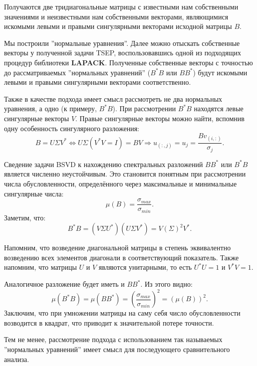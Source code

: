 Получаются две тридиагональные матрицы с известными нам собственными значениями и неизвестными нам собственными векторами, являющимися искомыми левыми и правыми сингулярными векторами исходной матрицы $B$.

Мы построили ''нормальные уравнения''. Далее можно отыскать собственные векторы у полученной задачи TSEP, воспользовавшись одной из подходящих процедур библиотеки \textbf{LAPACK}. Полученные собственные векторы с точностью до рассматриваемых ''нормальных уравнений'' (\(B^*B\) или \(BB^*\)) будут искомыми левыми и правыми сингулярными векторами соответственно.

Также в качестве подхода имеет смысл рассмотреть не два нормальных уравнения, а одно (к примеру, $B^*B$). При рассмотрении $B^*B$ находятся левые сингулярные векторы $V$. Правые сингулярные векторы можно найти, вспомнив одну особенность сингулярного разложения:
\begin{equation*}
     B=U \Sigma V^* \Leftrightarrow U\Sigma(V^*V=I)=BV \Rightarrow u_{(:,j)}=u_j= \frac{Bv_{(i,:)}}{\sigma_j}.
\end{equation*}


Сведение задачи BSVD к нахождению спектральных разложений \( B B^* \) или \( B^* B \) является численно неустойчивым. Это становится понятным при рассмотрении числа обусловленности, определённого через максимальные и минимальные сингулярные числа:
\[\mu(B) = \frac{\sigma_{max}}{\sigma_{min}}.\]
Заметим, что:
\[ B^*B=(V\Sigma U^*)(U \Sigma V^*)=V (\Sigma)^2 V^*. \]

\begin{note}
    Напомним, что возведение диагональной матрицы в степень эквивалентно возведению всех элементов диагонали в соответствующий показатель. Также напомним, что матрицы \(U\) и \(V\) являются унитарными, то есть \(U^*U=1\) и \(V^*V=1\).
\end{note}

Аналогичное разложение будет иметь и \(BB^*\). Из этого видно:
\[ \mu(B^*B) = \mu(BB^*) = \left( \frac{\sigma_{max}}{\sigma_{min}} \right)^2 =(\mu(B))^2.\]
Заключим, что при умножении матрицы на саму себя число обусловленности возводится в квадрат, что приводит к значительной потере точности. 

Тем не менее, рассмотрение подхода с использованием так называемых ''нормальных уравнений'' имеет смысл для последующего сравнительного анализа.

